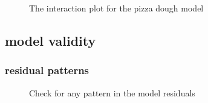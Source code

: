 \documentclass[
  a4paper,
]{scrbook}
\begin{document}
\begin{figure}[ht]


\caption{\label{fig-pd-ie}The interaction plot for the pizza dough
model}

\end{figure}%

\subsection{model validity}\label{model-validity}

\subsubsection{residual patterns}\label{residual-patterns}

\begin{figure}[ht]


\caption{\label{fig-pd-resid-seq}Check for any pattern in the model
residuals}

\end{figure}%
\end{document}
